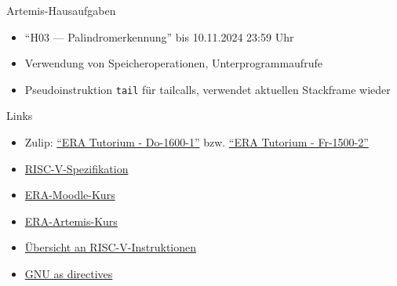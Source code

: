 \begin{frame}[c, fragile]{Artemis-Hausaufgaben}{}
	\begin{itemize}
		\item \enquote{H03 --- Palindromerkennung} bis 10.11.2024 23:59 Uhr
		\item Verwendung von Speicheroperationen, Unterprogrammaufrufe
		\item Pseudoinstruktion \verb|tail| für tailcalls, verwendet aktuellen Stackframe wieder
	\end{itemize}
\end{frame}

\begin{frame}[c, fragile]{Links}{}
	\begin{itemize}
		\item Zulip: \href{https://zulip.in.tum.de/#narrow/stream/2661-ERA-Tutorium---Do-1600-1}{\enquote{ERA Tutorium - Do-1600-1}}
		      bzw. \href{https://zulip.in.tum.de/#narrow/stream/2675-ERA-Tutorium---Fr-1500-2 }{\enquote{ERA Tutorium - Fr-1500-2}}
		\item \href{https://riscv.org/wp-content/uploads/2017/05/riscv-spec-v2.2.pdf}{RISC-V-Spezifikation}
		\item \href{https://www.moodle.tum.de/course/view.php?id=100633}{ERA-Moodle-Kurs}
		\item \href{https://artemis.in.tum.de/courses/401}{ERA-Artemis-Kurs}
		\item \href{https://msyksphinz-self.github.io/riscv-isadoc/html/index.html}{Übersicht an RISC-V-Instruktionen}
		\item \href{https://ftp.gnu.org/old-gnu/Manuals/gas/html_chapter/as_7.html}{GNU as directives}
	\end{itemize}
\end{frame}

\maketitle



